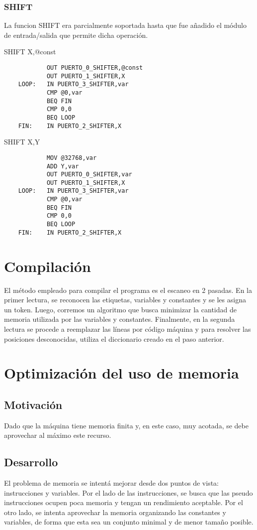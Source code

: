 \documentclass[12pt]{article}
\begin{document}
\subsubsection{SHIFT}
La funcion SHIFT era parcialmente soportada hasta que fue a\~nadido el m\'odulo de 
entrada/salida que permite dicha operaci\'on.

SHIFT X,@const
\begin{verbatim}
            OUT PUERTO_0_SHIFTER,@const
            OUT PUERTO_1_SHIFTER,X
    LOOP:   IN PUERTO_3_SHIFTER,var
            CMP @0,var
            BEQ FIN
            CMP 0,0
            BEQ LOOP
    FIN:    IN PUERTO_2_SHIFTER,X
\end{verbatim}

SHIFT X,Y
\begin{verbatim}
            MOV @32768,var
            ADD Y,var
            OUT PUERTO_0_SHIFTER,var
            OUT PUERTO_1_SHIFTER,X
    LOOP:   IN PUERTO_3_SHIFTER,var
            CMP @0,var
            BEQ FIN
            CMP 0,0
            BEQ LOOP
    FIN:    IN PUERTO_2_SHIFTER,X
\end{verbatim}

\section{Compilaci\'on}
El m\'etodo empleado para compilar el programa es el escaneo en 2 pasadas. En la
primer lectura, se reconocen las etiquetas, variables y constantes y se les asigna
un token. Luego, corremos un algoritmo que busca minimizar la cantidad de memoria
utilizada por las variables y constantes. Finalmente, en la segunda lectura se
procede a reemplazar las l\'ineas por c\'odigo m\'aquina y para resolver las
posiciones desconocidas, utiliza el diccionario creado en el paso anterior.

\section{Optimizaci\'on del uso de memoria}
\subsection{Motivaci\'on}
Dado que la m\'aquina tiene memoria finita y, en este caso, muy acotada,
 se debe aprovechar al m\'aximo este recurso.

\subsection{Desarrollo}
El problema de memoria se intent\'a mejorar desde dos puntos de vista: instrucciones
y variables. Por el lado de las instrucciones, se busca que las pseudo instrucciones
ocupen poca memoria y tengan un rendimiento aceptable. Por el otro lado, se intenta
aprovechar la memoria organizando las constantes y variables, de forma que esta sea
un conjunto minimal y de menor tama\~no posible.
\end{document}
